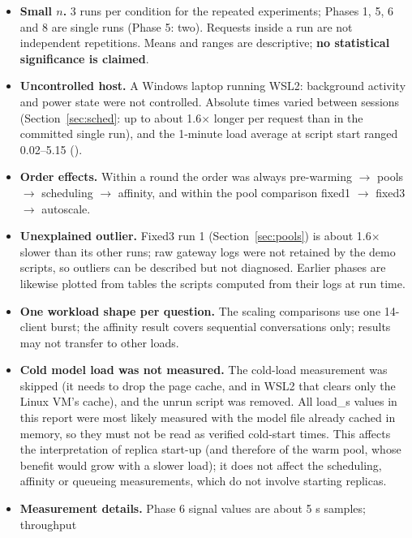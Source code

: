 \documentclass[11pt,a4paper]{article}
\DeclareRobustCommand{\code}[1]{\texttt{\detokenize{#1}}}
\begin{document}
\begin{itemize}
  \item \textbf{Small $n$.} 3 runs per condition for the repeated experiments; Phases 1, 5, 6 and 8
        are single runs (Phase 5: two). Requests inside a run are not independent repetitions. Means
        and ranges are descriptive; \textbf{no statistical significance is claimed}.
  \item \textbf{Uncontrolled host.} A Windows laptop running WSL2: background activity and power state
        were not controlled. Absolute times varied between sessions (Section~\ref{sec:sched}: up to
        about 1.6$\times$ longer per request than in the committed single run), and the 1-minute load
        average at script start ranged 0.02--5.15 (\code{run_log.txt}).
  \item \textbf{Order effects.} Within a round the order was always pre-warming $\rightarrow$ pools
        $\rightarrow$ scheduling $\rightarrow$ affinity, and within the pool comparison fixed1
        $\rightarrow$ fixed3 $\rightarrow$ autoscale.
  \item \textbf{Unexplained outlier.} Fixed3 run 1 (Section~\ref{sec:pools}) is about 1.6$\times$
        slower than its other runs; raw gateway logs were not retained by the demo scripts, so
        outliers can be described but not diagnosed. Earlier phases are likewise plotted from tables
        the scripts computed from their logs at run time.
  \item \textbf{One workload shape per question.} The scaling comparisons use one 14-client burst;
        the affinity result covers sequential conversations only; results may not transfer to other
        loads.
  \item \textbf{Cold model load was not measured.} The cold-load measurement was skipped (it needs
        \code{sudo} to drop the page cache, and in WSL2 that clears only the Linux VM's cache), and
        the unrun \code{cold_load_check.sh} script was removed. All load\_s values in this report
        were most likely measured with the model file already cached in memory, so they must not be
        read as verified cold-start times. This affects the interpretation of replica start-up (and
        therefore of the warm pool, whose benefit would grow with a slower load); it does not affect
        the scheduling, affinity or queueing measurements, which do not involve starting replicas.
  \item \textbf{Measurement details.} Phase 6 signal values are about 5 s samples; throughput

\end{itemize}
\end{document}
